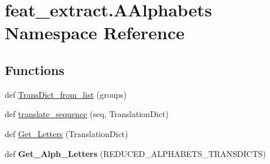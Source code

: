 \hypertarget{namespacefeat__extract_1_1_a_alphabets}{}\section{feat\+\_\+extract.\+A\+Alphabets Namespace Reference}
\label{namespacefeat__extract_1_1_a_alphabets}
\subsection*{Functions}
\begin{DoxyCompactItemize}
\item 
def \hyperlink{namespacefeat__extract_1_1_a_alphabets_acdda8523b57175e0e79064c4da723c5d}{Trans\+Dict\+\_\+from\+\_\+list} (groups)
\item 
def \hyperlink{namespacefeat__extract_1_1_a_alphabets_a545b327428912dcaf3506ba939531f1a}{translate\+\_\+sequence} (seq, Translation\+Dict)
\item 
def \hyperlink{namespacefeat__extract_1_1_a_alphabets_a28feff253bb06733c51fd2b916083f4b}{Get\+\_\+\+Letters} (Translation\+Dict)
\item 
\hypertarget{namespacefeat__extract_1_1_a_alphabets_aefe4e3087ddc61b949b5af5f07b2b245}{}def {\bfseries Get\+\_\+\+Alph\+\_\+\+Letters} (R\+E\+D\+U\+C\+E\+D\+\_\+\+A\+L\+P\+H\+A\+B\+E\+T\+S\+\_\+\+T\+R\+A\+N\+S\+D\+I\+C\+T\+S)\label{namespacefeat__extract_1_1_a_alphabets_aefe4e3087ddc61b949b5af5f07b2b245}

\end{DoxyCompactItemize}
